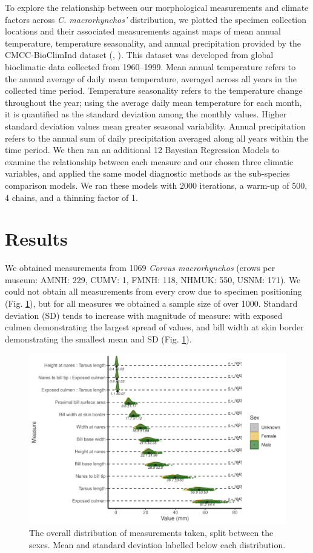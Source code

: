 \documentclass[10pt,a4paper]{article}
\begin{document}
To explore the relationship between our morphological measurements and climate factors across \emph{C. macrorhynchos'} distribution, we plotted the specimen collection locations and their associated measurements against maps of mean annual temperature, temperature seasonality, and annual precipitation provided by the CMCC-BioClimInd dataset (, ).
This dataset was developed from global bioclimatic data collected from 1960--1999.
Mean annual temperature refers to the annual average of daily mean temperature, averaged across all years in the collected time period.
Temperature seasonality refers to the temperature change throughout the year; using the average daily mean temperature for each month, it is quantified as the standard deviation among the monthly values.
Higher standard deviation values mean greater seasonal variability.
Annual precipitation refers to the annual sum of daily precipitation averaged along all years within the time period.
We then ran an additional 12 Bayesian Regression Models to examine the relationship between each measure and our chosen three climatic variables, and applied the same model diagnostic methods as the sub-species comparison models.
We ran these models with 2000 iterations, a warm-up of 500, 4 chains, and a thinning factor of 1.

\section{Results}\label{results}

We obtained measurements from 1069 \emph{Corvus macrorhynchos} (crows per museum: AMNH: 229, CUMV: 1, FMNH: 118, NHMUK: 550, USNM: 171).
We could not obtain all measurements from every crow due to specimen positioning (Fig. \ref{fig:overallPlot}), but for all measures we obtained a sample size of over 1000.
Standard deviation (SD) tends to increase with magnitude of measure: with exposed culmen demonstrating the largest spread of values, and bill width at skin border demonstrating the smallest mean and SD (Fig. \ref{fig:overallPlot}).

\begin{figure}
\includegraphics[width=0.9\linewidth]{../Figures/OverallSummaryPlot} \caption{The overall distribution of measurements taken, split between the sexes. Mean and standard deviation labelled below each distribution.}\label{fig:overallPlot}
\end{figure}
\end{document}

